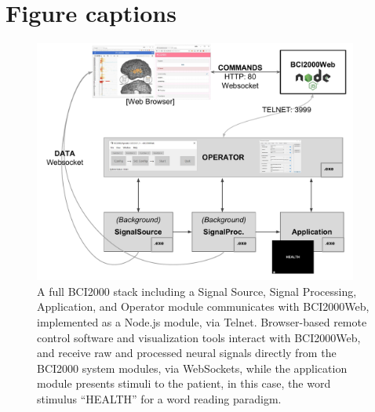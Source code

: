 \documentclass[utf8]{frontiersSCNS}
\begin{document}






\section*{Figure captions}


\begin{figure}[h!]
\begin{center}
\includegraphics[width=0.95\textwidth]{figures/f1_system_diagram}%
\end{center}
\caption{A full BCI2000 stack including a Signal Source, Signal Processing, Application, and Operator module communicates with BCI2000Web, implemented as a Node.js module, via Telnet.  Browser-based remote control software and visualization tools interact with BCI2000Web, and receive raw and processed neural signals directly from the BCI2000 system modules, via WebSockets, while the application module presents stimuli to the patient, in this case, the word stimulus ``HEALTH'' for a word reading paradigm.}\label{fig:system_diagram}
\end{figure}
\end{document}

